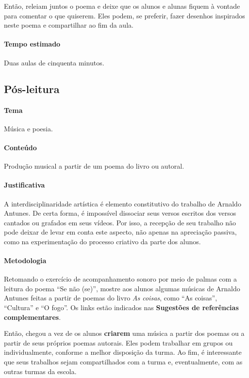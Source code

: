 \documentclass[11pt]{extarticle}
\begin{document}
	Então, releiam juntos o poema e deixe que os alunos e alunas
	fiquem à vontade para comentar o que quiserem. 
	Eles podem, se preferir, fazer desenhos inspirados neste
	poema e compartilhar ao fim da aula. 

\paragraph{Tempo estimado} Duas aulas de cinquenta minutos.


\subsection{Pós-leitura}



\paragraph{Tema} Música e poesia.

\paragraph{Conteúdo} Produção musical a partir de um poema do livro ou autoral.

\paragraph{Justificativa} A interdisciplinaridade artística é elemento
constitutivo do trabalho de Arnaldo Antunes. De certa forma, 
é impossível dissociar seus versos escritos dos versos cantados
ou grafados em seus vídeos. Por isso, a recepção de seu trabalho
não pode deixar de levar em conta este aspecto, não apenas
na apreciação passiva, como na experimentação do processo criativo
da parte dos alunos. 

\paragraph{Metodologia} Retomando o exercício de acompanhamento
sonoro por meio de palmas com a leitura do poema ``Se não (se)'',
mostre aos alunos algumas músicas de Arnaldo Antunes feitas a partir de
poemas do livro \textit{As coisas}, como ``As coisas'', ``Cultura'' e
``O fogo''. Os links estão indicados nas \textbf{Sugestões de referências complementares}.

Então, chegou a vez de os alunos \textbf{criarem} uma música a partir dos poemas 
ou a partir de seus próprios poemas autorais. 
Eles podem trabalhar em grupos ou individualmente,
conforme a melhor disposição da turma. 
Ao fim, é interessante que seus trabalhos sejam compartilhados
com a turma e, eventualmente, com as outras turmas da escola.
\end{document}
